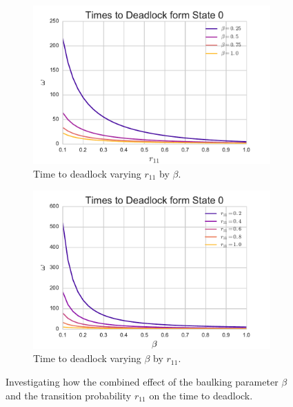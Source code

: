 \documentclass{article}
\begin{document}
\begin{figure}
\begin{center}
\begin{subfigure}[b]{0.45\textwidth}
    \includegraphics[width=\textwidth]{img/varyr11_bybeta.pdf}
    \caption{Time to deadlock varying $r_{11}$ by $\beta$.}
    \label{fig:varyr11bybeta}
\end{subfigure}
\begin{subfigure}[b]{0.45\textwidth}
    \includegraphics[width=\textwidth]{img/varybeta_byr11.pdf}
    \caption{Time to deadlock varying $\beta$ by $r_{11}$.}
    \label{fig:varybetabyr11}
\end{subfigure}
\end{center}
\caption{Investigating how the combined effect of the baulking parameter $\beta$ and the transition probability $r_{11}$ on the time to deadlock.}
\label{fig:combinedeffect_betar11}
\end{figure}
\end{document}

